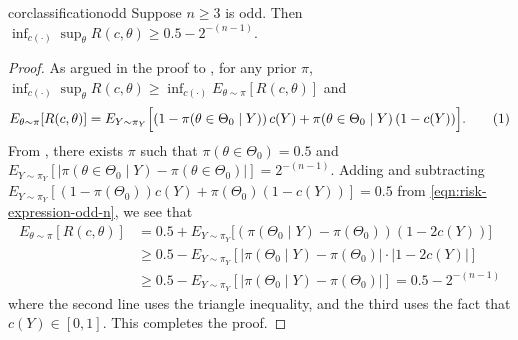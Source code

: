 \documentclass[12pt,reqno]{amsart}
\begin{document}
\begin{restatable}{cor}{classificationodd}
\label{cor:classification-odd}
Suppose $n \geq 3$ is odd. Then $\inf_{c(\cdot)} \sup_{\theta} R(c,\theta) \geq 0.5 - 2^{-(n-1)}$.
\end{restatable}

\begin{proof}
As argued in the proof to , for any prior $\pi$,  $\inf_{c(\cdot)} \sup_{\theta} R(c,\theta) \geq \inf_{c(\cdot)} E_{\theta \sim \pi}[ R(c,\theta)]$ and 
\[E_{\theta \sim \pi}[R(c,\theta)] = E_{Y \sim \pi_Y}\Big[
(1-\pi(\theta \in \Theta_0\mid Y))\,c(Y) + \pi(\theta \in \Theta_0\mid Y)\,(1-c(Y))\Big]. \numberthis \label{eqn:risk-expression-odd-n} \]
From , there exists $\pi$ such that $\pi(\theta \in \Theta_0) = 0.5$ and $E_{Y \sim \pi_Y}[ | \pi(\theta \in \Theta_0 \mid Y) - \pi(\theta \in \Theta_0) | ] = 2^{-(n-1)}$. Adding and subtracting $E_{Y \sim \pi_Y}[(1-\pi(\Theta_0)) c(Y) + \pi(\Theta_0) (1-c(Y))] = 0.5 $ from \eqref{eqn:risk-expression-odd-n}, we see that
\begin{align*}
E_{\theta \sim \pi}[R(c,\theta)]  &= 0.5 + E_{Y \sim \pi_Y}\Big[
(\pi(\Theta_0\mid Y) - \pi(\Theta_0) ) (1-2 c(Y)) \Big] \\
& \geq 0.5 - E_{Y \sim \pi_Y}[ | \pi(\Theta_0\mid Y) - \pi(\Theta_0) | \cdot |1-2c(Y)| ] \\
& \geq 0.5 - E_{Y \sim \pi_Y}[ | \pi(\Theta_0\mid Y) - \pi(\Theta_0) | ] = 0.5 - 2^{-(n-1)}
\end{align*}
where the second line uses the triangle inequality, and the third uses the fact that $c(Y) \in [0,1]$. This completes the proof.
\end{proof}


\estimation*
\end{document}
